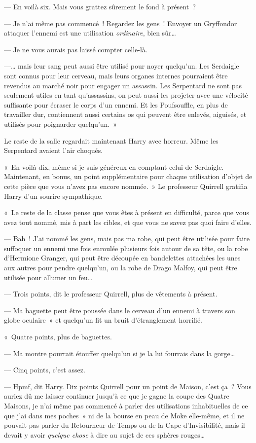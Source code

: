 --- En voilà six. Mais vous grattez sûrement le fond à présent~?

--- Je n'ai même pas commencé~! Regardez les gens~! Envoyer un Gryffondor attaquer l'ennemi est une utilisation \emph{ordinaire}, bien sûr…

--- Je ne vous aurais pas laissé compter celle-là.

---… mais leur sang peut aussi être utilisé pour noyer quelqu'un. Les Serdaigle sont connus pour leur cerveau, mais leurs organes internes pourraient être revendus au marché noir pour engager un assassin. Les Serpentard ne sont pas seulement utiles en tant qu'assassins, on peut aussi les projeter avec une vélocité suffisante pour écraser le corps d'un ennemi. Et les Poufsouffle, en plus de travailler dur, contiennent aussi certains os qui peuvent être enlevés, aiguisés, et utilisés pour poignarder quelqu'un.~»

Le reste de la salle regardait maintenant Harry avec horreur. Même les Serpentard avaient l'air choqués.

«~En voilà dix, même si je suis généreux en comptant celui de Serdaigle. Maintenant, en bonus, un point supplémentaire pour chaque utilisation d'objet de cette pièce que vous n'avez pas encore nommée.~» Le professeur Quirrell gratifia Harry d'un sourire sympathique.

«~Le reste de la classe pense que vous êtes à présent en difficulté, parce que vous avez tout nommé, mis à part les cibles, et que vous ne savez pas quoi faire d'elles.

--- Bah~! J'ai nommé les gens, mais pas ma robe, qui peut être utilisée pour faire suffoquer un ennemi une fois enroulée plusieurs fois autour de sa tête, ou la robe d'Hermione Granger, qui peut être découpée en bandelettes attachées les unes aux autres pour pendre quelqu'un, ou la robe de Drago Malfoy, qui peut être utilisée pour allumer un feu…

--- Trois points, dit le professeur Quirrell, plus de vêtements à présent.

--- Ma baguette peut être poussée dans le cerveau d'un ennemi à travers son globe oculaire~» et quelqu'un fit un bruit d'étranglement horrifié.

«~Quatre points, plus de baguettes.

--- Ma montre pourrait étouffer quelqu'un si je la lui fourrais dans la gorge…

--- Cinq points, c'est assez.

--- Hpmf, dit Harry. Dix points Quirrell pour un point de Maison, c'est ça~? Vous auriez dû me laisser continuer jusqu'à ce que je gagne la coupe des Quatre Maisons, je n'ai même pas commencé à parler des utilisations inhabituelles de ce que j'ai dans mes poches~» ni de la bourse en peau de Moke elle-même, et il ne pouvait pas parler du Retourneur de Temps ou de la Cape d'Invisibilité, mais il devait y avoir \emph{quelque chose} à dire au sujet de ces sphères rouges…


